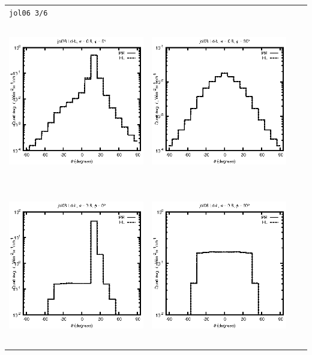 \begin{tabular}{c c c c}
\multicolumn{4}{l}{\texttt{jol06 3/6}} \\
\includegraphics[height=7cm]{../eps/jol06_Ld_b_fwd.eps} &
\includegraphics[height=7cm]{../eps/jol06_Ld_b_cross.eps} \\
\includegraphics[height=7cm]{../eps/jol06_Ld_it_fwd.eps} &
\includegraphics[height=7cm]{../eps/jol06_Ld_it_cross.eps} \\

\end{tabular}

